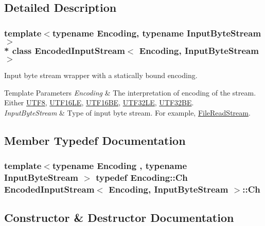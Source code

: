 \subsection{Detailed Description}
\subsubsection*{template$<$typename Encoding, typename Input\+Byte\+Stream$>$\\*
class Encoded\+Input\+Stream$<$ Encoding, Input\+Byte\+Stream $>$}

Input byte stream wrapper with a statically bound encoding. 


\begin{DoxyTemplParams}{Template Parameters}
{\em Encoding} & The interpretation of encoding of the stream. Either \hyperlink{structUTF8}{U\+T\+F8}, \hyperlink{structUTF16LE}{U\+T\+F16\+LE}, \hyperlink{structUTF16BE}{U\+T\+F16\+BE}, \hyperlink{structUTF32LE}{U\+T\+F32\+LE}, \hyperlink{structUTF32BE}{U\+T\+F32\+BE}. \\
\hline
{\em Input\+Byte\+Stream} & Type of input byte stream. For example, \hyperlink{classFileReadStream}{File\+Read\+Stream}. \\
\hline
\end{DoxyTemplParams}


\subsection{Member Typedef Documentation}
\subsubsection[{\texorpdfstring{Ch}{Ch}}]{\setlength{\rightskip}{0pt plus 5cm}template$<$typename Encoding , typename Input\+Byte\+Stream $>$ typedef Encoding\+::\+Ch {\bf Encoded\+Input\+Stream}$<$ Encoding, Input\+Byte\+Stream $>$\+::{\bf Ch}}\hypertarget{classEncodedInputStream_acc387a1364390da244bbb1ab07bdceca}{}\label{classEncodedInputStream_acc387a1364390da244bbb1ab07bdceca}


\subsection{Constructor \& Destructor Documentation}
